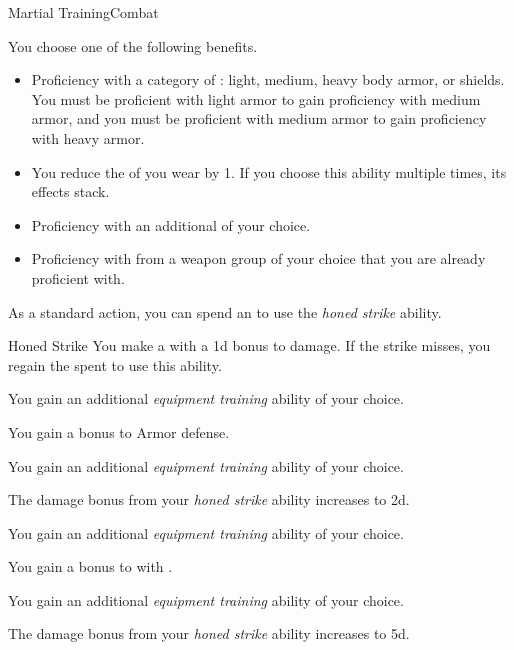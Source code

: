     \begin{feat}{Martial Training}{Combat}

         You choose one of the following benefits.
        \begin{itemize}
            \item Proficiency with a category of : light, medium, heavy body armor, or shields.
                You must be proficient with light armor to gain proficiency with medium armor, and you must be proficient with medium armor to gain proficiency with heavy armor.
            \item You reduce the  of  you wear by 1.
                If you choose this ability multiple times, its effects stack.
            \item Proficiency with an additional  of your choice.
            \item Proficiency with  from a weapon group of your choice that you are already proficient with.
        \end{itemize}

         As a standard action, you can spend an  to use the \textit{honed strike} ability.
        \begin{ability}{Honed Strike}
            You make a  with a \plus1d bonus to damage.
            If the strike misses, you regain the  spent to use this ability.
        \end{ability}

         You gain an additional \textit{equipment training} ability of your choice.

         You gain a  bonus to Armor defense.

         You gain an additional \textit{equipment training} ability of your choice.

         The damage bonus from your \textit{honed strike} ability increases to \plus2d.

         You gain an additional \textit{equipment training} ability of your choice.

         You gain a  bonus to  with .

         You gain an additional \textit{equipment training} ability of your choice.

         The damage bonus from your \textit{honed strike} ability increases to \plus5d.
    \end{feat}

